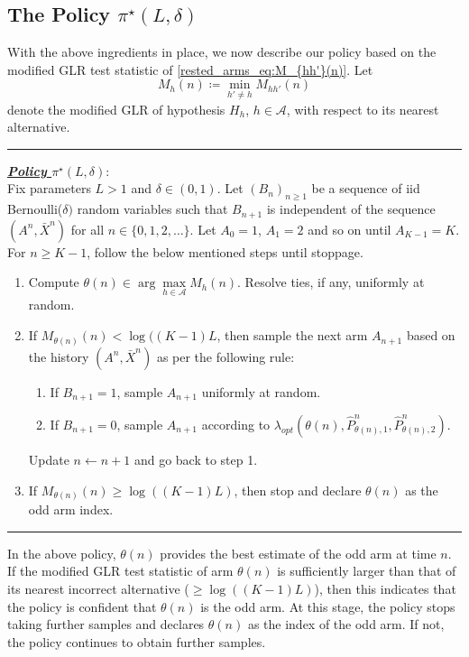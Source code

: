 \subsection{The Policy $\pi^\star(L,\delta)$}
With the above ingredients in place, we now describe our policy based on the modified GLR test statistic of \eqref{rested_arms_eq:M_{hh'}(n)}. Let
\begin{equation}
	M_h(n)\coloneqq \min\limits_{h'\neq h}M_{hh'}(n)\label{rested_arms_eq:M_h(n)}
\end{equation}
denote the modified GLR of hypothesis $H_h$, $h\in\mathcal{A}$, with respect to its nearest alternative.
\newpage
\vspace{.1in}
\hrule
\vspace{.1in}
\noindent \textbf{\underline{\emph{Policy }$\pi^{\star}(L,\delta)$}}:
\vspace{.1in}\\
Fix parameters $L> 1$ and $\delta\in(0,1)$. Let $(B_n)_{n\geq 1}$ be a sequence of iid Bernoulli($\delta)$ random variables such that $B_{n+1}$ is independent of the sequence $(A^n,\bar{X}^n)$ for all $n\in\{0,1,2,\ldots\}$.
Let $A_0=1$, $A_1=2$ and so on until $A_{K-1}=K$.  For $n\geq K-1$, follow the below mentioned steps until stoppage.
\begin{enumerate}
	\item Compute $\theta(n)\in \arg\max\limits_{h\in\mathcal{A}}M_h(n)$. Resolve ties, if any, uniformly at random.
	\item If $M_{\theta(n)}(n)<\log((K-1)L$, then sample the next arm $A_{n+1}$ based on the history $(A^n,\bar{X}^n)$ as per the following rule:
	    \begin{enumerate}
            \item If $B_{n+1}=1$, sample $A_{n+1}$ uniformly at random.
            \item If $B_{n+1}=0$, sample $A_{n+1}$ according to $\lambda_{opt}(\theta(n),\hat{P}^n_{\theta(n),1},\hat{P}^n_{\theta(n),2})$.
	    \end{enumerate}
	    Update $n \leftarrow n+1$ and go back to step 1.	
	\item If $M_{\theta(n)}(n)\geq\log((K-1)L)$, then stop and declare $\theta(n)$ as the odd arm index.
\end{enumerate}
\vspace{.1in}
\hrule
\vspace{0.1in}
In the above policy, $\theta(n)$ provides the best estimate  of the odd arm at time $n$. If the modified GLR test statistic of arm $\theta(n)$ is sufficiently larger than that of its nearest incorrect alternative ($\geq \log((K-1)L)$), then this indicates that the policy is confident that $\theta(n)$ is the odd arm. At this stage, the policy stops taking further samples and declares $\theta(n)$ as the index of the odd arm. If not, the policy continues to obtain further samples.


